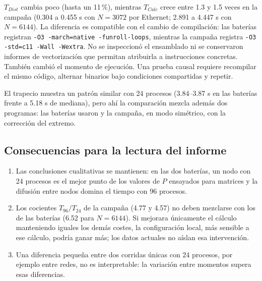 $T_{Dist}$ cambia poco (hasta un 11\,\%), mientras $T_{Calc}$ crece entre 1.3 y 1.5 veces en la campaña (0.304 a 0.455 s con $N=3072$ por Ethernet; 2.891 a 4.447 s con $N=6144$). La diferencia es compatible con el cambio de compilación: las baterías registran \texttt{-O3 -march=native -funroll-loops}, mientras la campaña registra \texttt{-O3 -std=c11 -Wall -Wextra}. No se inspeccionó el ensamblado ni se conservaron informes de vectorización que permitan atribuirla a instrucciones concretas. También cambió el momento de ejecución. Una prueba causal requiere recompilar el mismo código, alternar binarios bajo condiciones compartidas y repetir.

El trapecio muestra un patrón similar con 24 procesos (3.84--3.87 s en las baterías frente a 5.18 s de mediana), pero ahí la comparación mezcla además dos programas: las baterías usaron  y la campaña,  en modo simétrico, con la corrección del extremo.

\subsection{Consecuencias para la lectura del informe}

\begin{enumerate}
\item Las conclusiones cualitativas se mantienen: en las dos baterías, un nodo con 24 procesos es el mejor punto de los valores de $P$ ensayados para matrices y la difusión entre nodos domina el tiempo con 96 procesos.
\item Los cocientes $T_{96}/T_{24}$ de la campaña (4.77 y 4.57) no deben mezclarse con los de las baterías (6.52 para $N=6144$). Si mejorara únicamente el cálculo manteniendo iguales los demás costes, la configuración local, más sensible a ese cálculo, podría ganar más; los datos actuales no aíslan esa intervención.
\item Una diferencia pequeña entre dos corridas únicas con 24 procesos, por ejemplo entre redes, no es interpretable: la variación entre momentos supera esas diferencias.
\end{enumerate}
